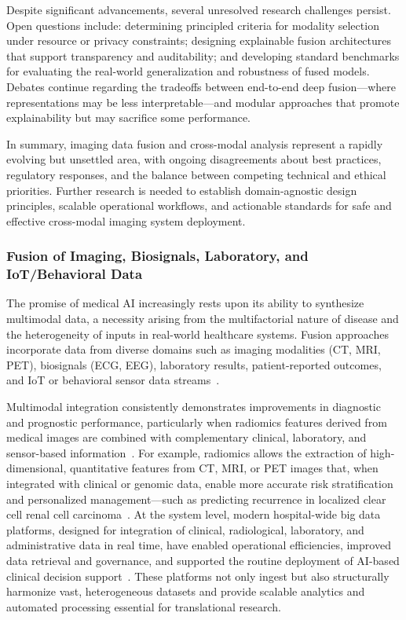 \documentclass[sigconf]{acmart}
\begin{document}
Despite significant advancements, several unresolved research challenges persist. Open questions include: determining principled criteria for modality selection under resource or privacy constraints; designing explainable fusion architectures that support transparency and auditability; and developing standard benchmarks for evaluating the real-world generalization and robustness of fused models. Debates continue regarding the tradeoffs between end-to-end deep fusion—where representations may be less interpretable—and modular approaches that promote explainability but may sacrifice some performance.

In summary, imaging data fusion and cross-modal analysis represent a rapidly evolving but unsettled area, with ongoing disagreements about best practices, regulatory responses, and the balance between competing technical and ethical priorities. Further research is needed to establish domain-agnostic design principles, scalable operational workflows, and actionable standards for safe and effective cross-modal imaging system deployment.

\subsubsection{Fusion of Imaging, Biosignals, Laboratory, and IoT/Behavioral Data}

The promise of medical AI increasingly rests upon its ability to synthesize multimodal data, a necessity arising from the multifactorial nature of disease and the heterogeneity of inputs in real-world healthcare systems. Fusion approaches incorporate data from diverse domains such as imaging modalities (CT, MRI, PET), biosignals (ECG, EEG), laboratory results, patient-reported outcomes, and IoT or behavioral sensor data streams~\cite{ref46,ref53,ref67,ref71}. 

Multimodal integration consistently demonstrates improvements in diagnostic and prognostic performance, particularly when radiomics features derived from medical images are combined with complementary clinical, laboratory, and sensor-based information~\cite{ref46,ref53,ref67}. For example, radiomics allows the extraction of high-dimensional, quantitative features from CT, MRI, or PET images that, when integrated with clinical or genomic data, enable more accurate risk stratification and personalized management—such as predicting recurrence in localized clear cell renal cell carcinoma~\cite{ref53}. At the system level, modern hospital-wide big data platforms, designed for integration of clinical, radiological, laboratory, and administrative data in real time, have enabled operational efficiencies, improved data retrieval and governance, and supported the routine deployment of AI-based clinical decision support~\cite{ref84,ref106}. These platforms not only ingest but also structurally harmonize vast, heterogeneous datasets and provide scalable analytics and automated processing essential for translational research.
\end{document}
